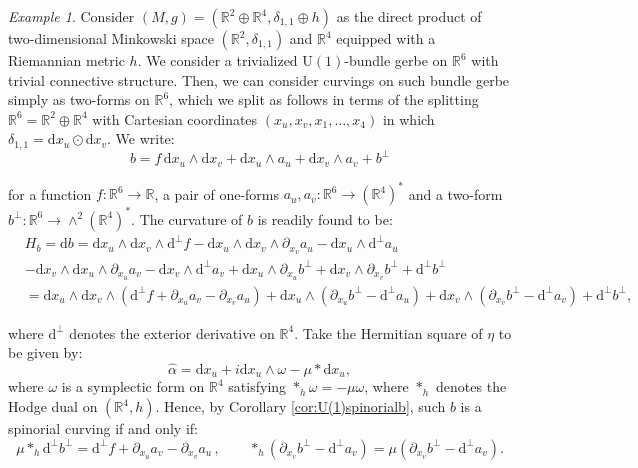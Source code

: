 \documentclass[10pt,a4paper,twoside,reqno]{amsart}
\theoremstyle{plain}
\theoremstyle{definition}
\theoremstyle{remark}
\newtheorem{example}[thm]{Example}
\def\dd{\mathrm{d}}
\def\U{\mathrm{U}}
\def\dd{\mathrm{d}}
\begin{document}
\begin{example}
Consider $(M,g) = (\mathbb{R}^2 \oplus \mathbb{R}^4 , \delta_{1,1}\oplus h)$ as the direct product of two-dimensional Minkowski space $(\mathbb{R}^2 , \delta_{1,1})$ and $\mathbb{R}^4$ equipped with a Riemannian metric $h$. We consider a trivialized $\U(1)$-bundle gerbe on $\mathbb{R}^6$ with trivial connective structure. Then, we can consider curvings on such bundle gerbe simply as two-forms on $\mathbb{R}^6$, which we split as follows in terms of the splitting $\mathbb{R}^6 = \mathbb{R}^2 \oplus \mathbb{R}^4$ with Cartesian coordinates $(x_u,x_v,x_1,\hdots , x_4)$ in which $\delta_{1,1} = \dd x_u \odot \dd x_v$. We write:
\begin{equation*}
b = f\, \dd x_u \wedge \dd x_v + \dd x_u \wedge a_u + \dd x_v \wedge a_v + b^{\perp}
\end{equation*}

\noindent
for a function $f\colon \mathbb{R}^6\to \mathbb{R}$, a pair of one-forms $a_u , a_v\colon \mathbb{R}^6 \to (\mathbb{R}^4)^{\ast}$ and a two-form $b^{\perp} \colon \mathbb{R}^6 \to \wedge^2 (\mathbb{R}^4)^{\ast}$. The curvature of $b$ is readily found to be:
\begin{eqnarray*}
& H_b = \dd b = \dd x_u \wedge \dd x_v \wedge \dd^{\perp}f - \dd x_u \wedge \dd x_v \wedge \partial_{x_v} a_u - \dd x_u   \wedge \dd^{\perp} a_u \\
& - \dd x_v \wedge \dd x_u \wedge \partial_{x_u} a_v - \dd x_v \wedge \dd^{\perp} a_v + \dd x_u \wedge \partial_{x_u} b^{\perp} + \dd x_v \wedge \partial_{x_v} b^{\perp} + \dd^{\perp} b^{\perp} \\
& = \dd x_u \wedge \dd x_v \wedge (\dd^{\perp}f + \partial_{x_u} a_v - \partial_{x_v} a_u) + \dd x_u   \wedge (\partial_{x_u} b^{\perp} - \dd^{\perp} a_u) + \dd x_v   \wedge (\partial_{x_v} b^{\perp} - \dd^{\perp} a_v) + \dd^{\perp} b^{\perp},
\end{eqnarray*}

\noindent
where $\dd^{\perp}$ denotes the exterior derivative on $\mathbb{R}^4$. Take the Hermitian square of $\eta$ to be given by: $$\widehat{\alpha} = \dd x_u + i \dd x_u \wedge \omega -\mu \ast \dd x_u,$$ where $\omega$ is a symplectic form on $\mathbb{R}^4$ satisfying $\ast_h \omega = -\mu \omega$, where $\ast_h$ denotes the Hodge dual on $(\mathbb{R}^4 , h)$. Hence, by Corollary \ref{cor:U(1)spinorialb}, such $b$ is a spinorial curving if and only if:
\begin{equation*}
\mu \ast_h \dd^{\perp} b^{\perp} = \dd^{\perp}f + \partial_{x_u} a_v - \partial_{x_v} a_u \, ,\qquad \ast_h (\partial_{x_v} b^{\perp} - \dd^{\perp} a_v) = \mu (\partial_{x_v} b^{\perp} - \dd^{\perp} a_v).
\end{equation*}


\end{example}
\end{document}
